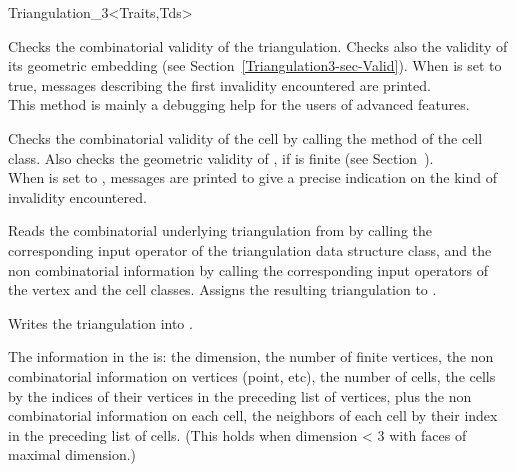 \begin{ccClassTemplate}{Triangulation_3<Traits,Tds>}
\begin{ccAdvanced}
{Checks the combinatorial validity of the triangulation. Checks also the
validity of its geometric embedding (see
Section~\ref{Triangulation3-sec-Valid}). When  is set to true, 
messages describing the first invalidity encountered are printed.\\
This method is  mainly a debugging help for the users of advanced features.
}

{Checks the combinatorial validity of the cell by calling the
 method of the  cell class. Also checks the
geometric validity of , if  is finite 
(see Section~\pageref{Triangulation3-sec-Valid}).\\
When  is set to , messages are printed to give
a precise indication on the kind of invalidity encountered.}

\end{ccAdvanced}


{Reads the combinatorial underlying triangulation from  by
calling the corresponding input operator of the triangulation data
structure class, and the non combinatorial information by calling the
corresponding input operators of the vertex and the cell
classes. Assigns the resulting triangulation to .}

{Writes the triangulation  into .}

The information in the  is: the dimension, the number of
finite vertices, the non combinatorial information on vertices (point,
etc), the number of cells, the cells by the indices of their vertices
in the preceding list of vertices, plus the non combinatorial
information on each cell, the neighbors of each cell by their index in
the preceding list of cells. (This holds when dimension < 3 with faces
of maximal dimension.)

\end{ccClassTemplate}

